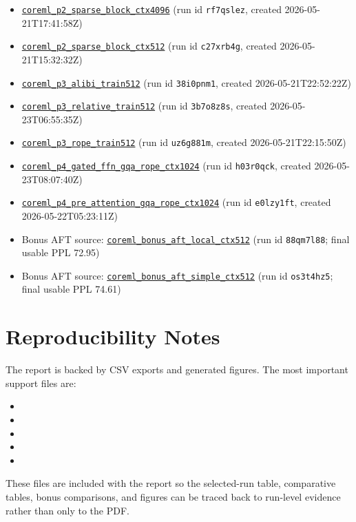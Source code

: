 \documentclass[11pt]{article}
\begin{document}
\begin{itemize}
\item \href{https://wandb.ai/krishsachdev246-bits-pilani/saidl-core-ml/runs/rf7qslez}{\texttt{coreml\_p2\_sparse\_block\_ctx4096}} (run id \texttt{rf7qslez}, created 2026-05-21T17:41:58Z)
\item \href{https://wandb.ai/krishsachdev246-bits-pilani/saidl-core-ml/runs/c27xrb4g}{\texttt{coreml\_p2\_sparse\_block\_ctx512}} (run id \texttt{c27xrb4g}, created 2026-05-21T15:32:32Z)
\item \href{https://wandb.ai/krishsachdev246-bits-pilani/saidl-core-ml/runs/38i0pnm1}{\texttt{coreml\_p3\_alibi\_train512}} (run id \texttt{38i0pnm1}, created 2026-05-21T22:52:22Z)
\item \href{https://wandb.ai/krishsachdev246-bits-pilani/saidl-core-ml/runs/3b7o8z8s}{\texttt{coreml\_p3\_relative\_train512}} (run id \texttt{3b7o8z8s}, created 2026-05-23T06:55:35Z)
\item \href{https://wandb.ai/krishsachdev246-bits-pilani/saidl-core-ml/runs/uz6g881m}{\texttt{coreml\_p3\_rope\_train512}} (run id \texttt{uz6g881m}, created 2026-05-21T22:15:50Z)
\item \href{https://wandb.ai/krishsachdev246-bits-pilani/saidl-core-ml/runs/h03r0qck}{\texttt{coreml\_p4\_gated\_ffn\_gqa\_rope\_ctx1024}} (run id \texttt{h03r0qck}, created 2026-05-23T08:07:40Z)
\item \href{https://wandb.ai/krishsachdev246-bits-pilani/saidl-core-ml/runs/e0lzy1ft}{\texttt{coreml\_p4\_pre\_attention\_gqa\_rope\_ctx1024}} (run id \texttt{e0lzy1ft}, created 2026-05-22T05:23:11Z)
\item Bonus AFT source: \href{https://wandb.ai/krishsachdev246-bits-pilani/saidl-core-ml/runs/88qm7l88}{\texttt{coreml\_bonus\_aft\_local\_ctx512}} (run id \texttt{88qm7l88}; final usable PPL 72.95)
\item Bonus AFT source: \href{https://wandb.ai/krishsachdev246-bits-pilani/saidl-core-ml/runs/os3t4hz5}{\texttt{coreml\_bonus\_aft\_simple\_ctx512}} (run id \texttt{os3t4hz5}; final usable PPL 74.61)
\end{itemize}
\normalsize

\section{Reproducibility Notes}
The report is backed by CSV exports and generated figures. The most important support files are:
\begin{itemize}
\item {}
\item {}
\item {}
\item {}
\item {}
\end{itemize}
These files are included with the report so the selected-run table, comparative tables, bonus comparisons, and figures can be traced back to run-level evidence rather than only to the PDF.
\end{document}
